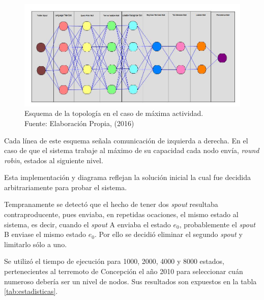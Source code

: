 \begin{figure}[H]
	\centering
	\captionsetup{justification=centering}
	\includegraphics[scale=0.5]{images/ImplementacionTopologia1.2.png}
	\caption[Esquema de la topología en el caso de máxima actividad.]{Esquema de la topología en el caso de máxima actividad.\\Fuente: Elaboración Propia, (2016)}
	\label{fig:Implementacion1p2}
\end{figure}

Cada línea de este esquema señala comunicación de izquierda a derecha. En el caso de que el sistema trabaje al máximo de su capacidad cada nodo envía, \textit{round robin}, estados al siguiente nivel.

Esta implementación y diagrama reflejan la solución inicial la cual fue decidida arbitrariamente para probar el sistema.

Tempranamente se detectó que el hecho de tener dos \textit{spout} resultaba contraproducente, pues enviaba, en repetidas ocaciones, el mismo estado al sistema, es decir, cuando el \textit{spout} A enviaba el estado $e_{0}$, probablemente el \textit{spout} B enviase el mismo estado $e_{0}$. Por ello se decidió eliminar el segundo \textit{spout} y limitarlo sólo a uno.

Se utilizó el tiempo de ejecución para 1000, 2000, 4000 y 8000 estados, pertenecientes al terremoto de Concepción el año 2010 para seleccionar cuán numeroso debería ser un nivel de nodos. Sus resultados son expuestos en la tabla \ref{tab:estadisticas}.

